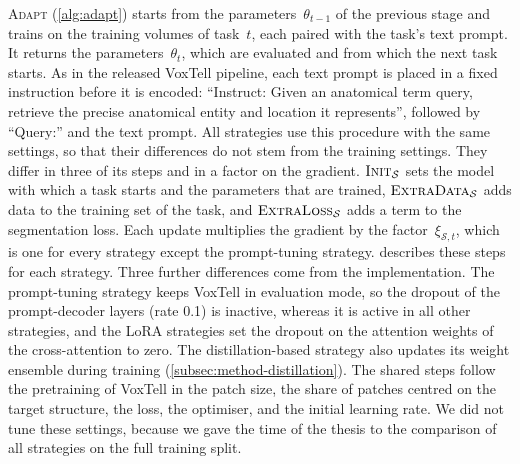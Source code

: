 \textsc{Adapt} (\cref{alg:adapt}) starts from the parameters~$\theta_{t-1}$ of the previous stage and trains on the training volumes of task~$t$, each paired with the task's text prompt.
It returns the parameters~$\theta_t$, which are evaluated and from which the next task starts.
As in the released VoxTell pipeline, each text prompt is placed in a fixed instruction before it is encoded: ``Instruct: Given an anatomical term query, retrieve the precise anatomical entity and location it represents'', followed by ``Query:'' and the text prompt.
All strategies use this procedure with the same settings, so that their differences do not stem from the training settings.
They differ in three of its steps and in a factor on the gradient.
$\textsc{Init}_{\mathcal{S}}$ sets the model with which a task starts and the parameters that are trained, $\textsc{ExtraData}_{\mathcal{S}}$ adds data to the training set of the task, and $\textsc{ExtraLoss}_{\mathcal{S}}$ adds a term to the segmentation loss.
Each update multiplies the gradient by the factor~$\xi_{\mathcal{S},t}$, which is one for every strategy except the prompt-tuning strategy.
 describes these steps for each strategy.
Three further differences come from the implementation.
The prompt-tuning strategy keeps VoxTell in evaluation mode, so the dropout of the prompt-decoder layers (rate 0.1) is inactive, whereas it is active in all other strategies, and the LoRA strategies set the dropout on the attention weights of the cross-attention to zero.
The distillation-based strategy also updates its weight ensemble during training (\cref{subsec:method-distillation}).
The shared steps follow the pretraining of VoxTell in the patch size, the share of patches centred on the target structure, the loss, the optimiser, and the initial learning rate.
We did not tune these settings, because we gave the time of the thesis to the comparison of all strategies on the full training split.

